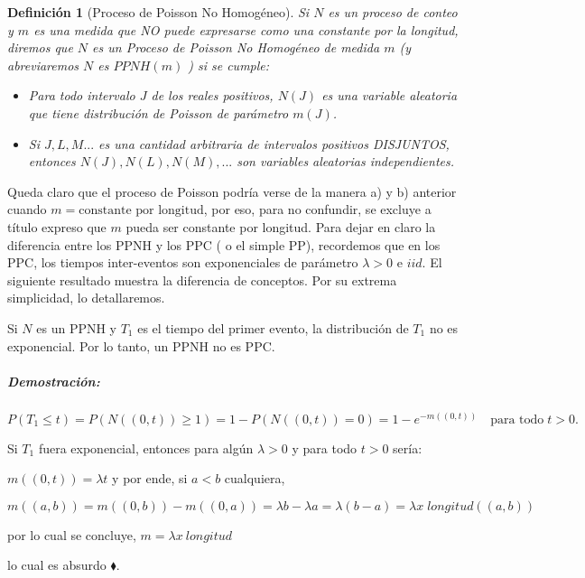 \documentclass[
  oneside]{article}
\newtheorem{definition}{Definición}[section]
\begin{document}
\begin{definition}[Proceso de Poisson No Homogéneo]\label{def:3}
Si $N$ es un proceso de conteo y $m$ es una medida que NO puede expresarse como una constante por la longitud, diremos que $N$ es un Proceso de Poisson No Homogéneo de medida $m$ (y abreviaremos $N$ es $PPNH(m)$ ) si se cumple:

\begin{itemize}
\item[a)] Para todo intervalo $J$ de los reales positivos, $N(J)$ es una variable aleatoria que tiene distribución de Poisson de parámetro $m(J)$.
\item[b)] Si $J, L, M...$ es una cantidad arbitraria de intervalos positivos DISJUNTOS, entonces $N(J), N(L), N(M),...$ son variables aleatorias independientes.
\end{itemize}
\end{definition}

Queda claro que el proceso de Poisson podría verse de la manera a) y b)
anterior cuando \(m=\text{constante por longitud}\), por eso, para no
confundir, se excluye a título expreso que \(m\) pueda ser constante por
longitud. Para dejar en claro la diferencia entre los PPNH y los PPC ( o
el simple PP), recordemos que en los PPC, los tiempos inter-eventos son
exponenciales de parámetro \(\lambda>0\) e \(iid\). El siguiente
resultado muestra la diferencia de conceptos. Por su extrema
simplicidad, lo detallaremos.

\begin{theorem}\label{thm:2}
Si $N$ es un PPNH y $T_1$ es el tiempo del primer evento, la distribución de $T_1$ no es exponencial.
Por lo tanto, un PPNH no es PPC.
\end{theorem}

\hypertarget{demostraciuxf3n}{%
\subparagraph{Demostración:}\label{demostraciuxf3n}}

\[
P(T_1\le t)=P(N((0,t))\ge 1)=1-P(N((0,t))=0)= 1-e^{-m((0,t))}\quad\text{para todo}\; t>0.
\]

Si \(T_1\) fuera exponencial, entonces para algún \(\lambda>0\) y para
todo \(t>0\) sería:

\(m((0,t))= \lambda t\) y por ende, si \(a <b\) cualquiera,

\[m((a,b))= m((0,b))-m((0,a))=\lambda b- \lambda a= \lambda(b-a)=\lambda x\;longitud((a,b))\]

por lo cual se concluye, \(m=\lambda x\:longitud\)

lo cual es absurdo \(\blacklozenge\).
\end{document}
